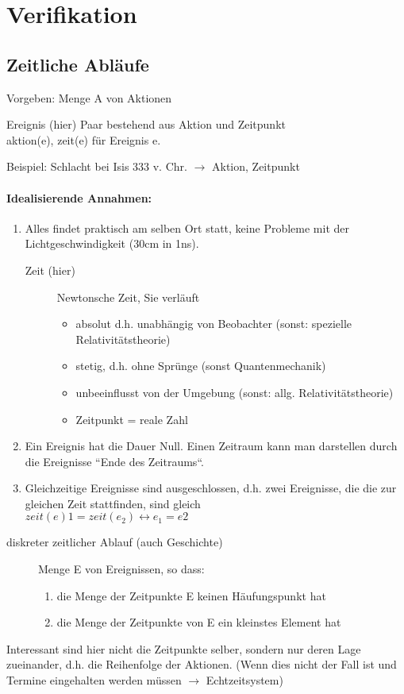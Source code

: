 \chapter{Verifikation}

\section{Zeitliche Abläufe}
Vorgeben: Menge A von Aktionen
\begin{description}
\item {Ereignis (hier)} Paar bestehend aus Aktion und Zeitpunkt\\aktion(e), zeit(e) für Ereignis e.
\end{description}
Beispiel: Schlacht bei Isis 333 v. Chr. $\rightarrow$ Aktion, Zeitpunkt
\subsubsection*{Idealisierende Annahmen:}
\begin{enumerate}
\item Alles findet praktisch am selben Ort statt, keine Probleme mit der Lichtgeschwindigkeit (30cm in 1ns).
	\begin{description}
	\item[Zeit (hier)] Newtonsche Zeit, Sie verläuft
		\begin{itemize}
		\item absolut d.h. unabhängig von Beobachter (sonst: spezielle Relativitätstheorie)
		\item stetig, d.h. ohne Sprünge (sonst Quantenmechanik)
		\item unbeeinflusst von der Umgebung (sonst: allg. Relativitätstheorie)
		\item Zeitpunkt = reale Zahl
		\end{itemize}
	\end{description}
\item Ein Ereignis hat die Dauer Null. Einen Zeitraum kann man darstellen durch die Ereignisse “Ende des Zeitraums“.
\item Gleichzeitige Ereignisse sind ausgeschlossen, d.h. zwei Ereignisse, die die zur gleichen Zeit stattfinden, sind gleich\\
$zeit(e)1 = zeit(e_2) \leftrightarrow e_1 = e2 $
\end{enumerate}

\begin{description}
\item[diskreter zeitlicher Ablauf (auch Geschichte)] Menge E von Ereignissen, so dass:
	\begin{enumerate}
		\item die Menge der Zeitpunkte E keinen Häufungspunkt hat
		\item die Menge der Zeitpunkte von E ein kleinstes Element hat
	\end{enumerate}
\end{description}
Interessant sind hier nicht die Zeitpunkte selber, sondern nur deren Lage zueinander, d.h. die Reihenfolge der Aktionen. (Wenn dies nicht der Fall ist und Termine eingehalten werden müssen $\rightarrow$ Echtzeitsystem)

